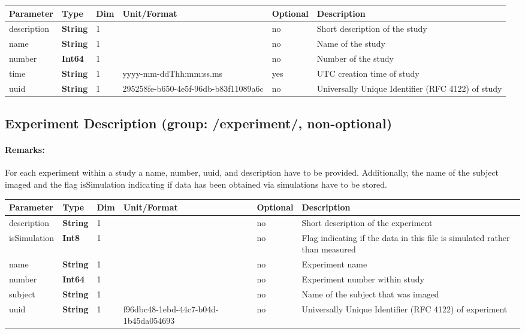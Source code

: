 \documentclass[landscape,a4paper]{article} %
\newcommand{\inltab}[1]{{\ttfamily\bfseries\color{blue}#1}}
\newcommand{\inlvar}[1]{{\ttfamily#1}}
\begin{document}
\setlength\extrarowheight{5pt}
\noindent \begin{tabularx}{\columnwidth}{lllllX} 
\textbf{Parameter} & \textbf{Type} & \textbf{Dim} & \textbf{Unit/Format} & \textbf{Optional} & \textbf{Description} \\ \hline 
\inlvar{description} & \inltab{String} & 1 & & no & Short description of the study \\ \hline
\inlvar{name} & \inltab{String} & 1 & & no & Name of the study \\ \hline
\inlvar{number} & \inltab{Int64} & 1 & & no & Number of the study\\ \hline
\inlvar{time} & \inltab{String} & 1 & yyyy-mm-ddThh:mm:ss.ms & yes & UTC creation time of study \\ \hline
\inlvar{uuid} & \inltab{String} & 1 & 295258fe-b650-4e5f-96db-b83f11089a6c & no & Universally Unique Identifier (RFC 4122) of study \\ \hline 
\end{tabularx}
\setlength\extrarowheight{0pt}


\subsection{Experiment Description (group: \inlvar{/experiment/}, non-optional)}

\begin{multicols}{2}
\paragraph{Remarks:} For each experiment within a study a \inlvar{name}, \inlvar{number}, \inlvar{uuid}, and \inlvar{description} have to be provided. Additionally, the name of the \inlvar{subject} imaged and the flag \inlvar{isSimulation} indicating if data has been obtained via simulations have to be stored.
\end{multicols}

\setlength\extrarowheight{5pt}
\noindent \begin{tabularx}{\columnwidth}{lllllX} 
\textbf{Parameter} & \textbf{Type} & \textbf{Dim} & \textbf{Unit/Format} & \textbf{Optional} & \textbf{Description} \\ \hline 
\inlvar{description} & \inltab{String} & 1 & & no & Short description of the experiment \\ \hline
\inlvar{isSimulation} & \inltab{Int8} & 1 & & no & Flag indicating if the data in this file is simulated rather than measured \\ \hline
\inlvar{name} & \inltab{String} & 1 & & no & Experiment name \\ \hline
\inlvar{number} & \inltab{Int64} & 1 & & no & Experiment number within study\\ \hline
\inlvar{subject} & \inltab{String} & 1 & & no & Name of the subject that was imaged \\ \hline 
\inlvar{uuid} & \inltab{String} & 1 & f96dbc48-1ebd-44c7-b04d-1b45da054693 & no & Universally Unique Identifier (RFC 4122) of experiment \\ \hline 
\end{tabularx}
\setlength\extrarowheight{0pt}
\end{document}
